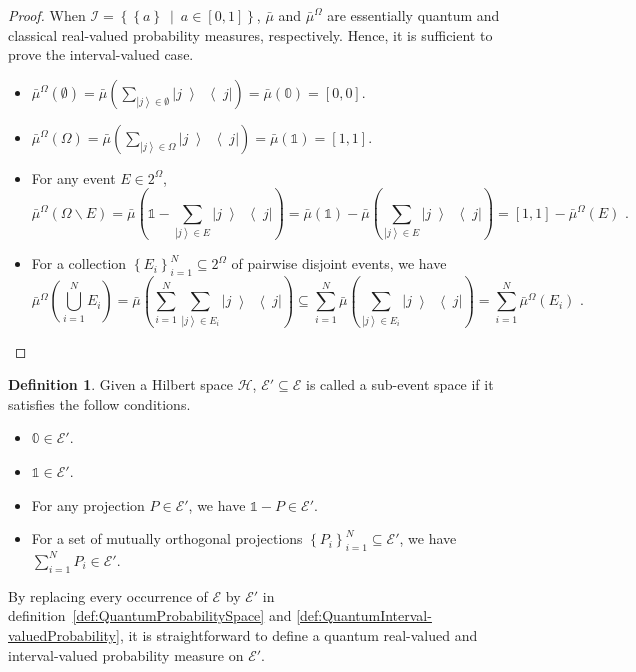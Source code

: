 \documentclass[12pt]{iopart}
\theoremstyle{plain}
\theoremstyle{definition}
\newtheorem{definition}[thm]{Definition}
\newcommand{\Hilb}{\mathcal{H}}
\newcommand{\events}{\ensuremath{\mathcal{E}}}
\newcommand{\ket}[1]{{\left\vert{#1}\right\rangle}}
\newcommand{\op}[2]{\ensuremath{\left\vert{#1}\middle\rangle\middle\langle{#2}\right\vert}}
\newcommand{\proj}[1]{\op{#1}{#1}}
\newcommand{\set}[2]{\ensuremath{\left\{ {#1}~\middle|~{#2}\right\} }}
\begin{document}
\begin{proof}When $\mathscr{I}=\set{\left\{ a\right\} }{a\in\left[0,1\right]}$,
$\bar{\mu}$ and $\bar{\mu}^{\Omega}$ are essentially quantum and
classical real-valued probability measures, respectively. Hence, it
is sufficient to prove the interval-valued case.
\begin{itemize}
\item $\bar{\mu}^{\Omega}(\emptyset)=\bar{\mu}\left(\sum_{\ket{j}\in\emptyset}\proj{j}\right)=\bar{\mu}\left(\mathbb{0}\right)=[0,0]$. 
\item $\bar{\mu}^{\Omega}(\Omega)=\bar{\mu}\left(\sum_{\ket{j}\in\Omega}\proj{j}\right)=\bar{\mu}\left(\mathbb{1}\right)=[1,1]$. 
\item For any event $E\in2^{\Omega}$,
\begin{equation}
\bar{\mu}^{\Omega}\left(\Omega\backslash E\right)=\bar{\mu}\left(\mathbb{1}-\sum_{\ket{j}\in E}\proj{j}\right)=\bar{\mu}\left(\mathbb{1}\right)-\bar{\mu}\left(\sum_{\ket{j}\in E}\proj{j}\right)=\left[1,1\right]-\bar{\mu}^{\Omega}\left(E\right)\textrm{ .}
\end{equation}
\item For a collection $\left\{ E_{i}\right\} _{i=1}^{N}\subseteq2^{\Omega}$
of pairwise disjoint events, we have
\begin{equation}
\bar{\mu}^{\Omega}\left(\bigcup_{i=1}^{N}E_{i}\right)=\bar{\mu}\left(\sum_{i=1}^{N}\sum_{\ket{j}\in E_{i}}\proj{j}\right)\subseteq\sum_{i=1}^{N}\bar{\mu}\left(\sum_{\ket{j}\in E_{i}}\proj{j}\right)=\sum_{i=1}^{N}\bar{\mu}^{\Omega}\left(E_{i}\right)\textrm{ .}
\end{equation}
\end{itemize}
\end{proof}

\begin{definition}Given a Hilbert space $\Hilb$, $\events'\subseteq\events$
is called a sub-event space if it satisfies the follow conditions.
\begin{itemize}
\item $\mathbb{0}\in\events'$.
\item $\mathbb{1}\in\events'$.
\item For any projection $P\in\events'$, we have $\mathbb{1}-P\in\events'$.
\item For a set of mutually orthogonal projections $\left\{ P_{i}\right\} _{i=1}^{N}\subseteq\events'$,
we have $\sum_{i=1}^{N}P_{i}\in\events'$.
\end{itemize}
By replacing every occurrence of $\events$ by $\events'$ in definition~\ref{def:QuantumProbabilitySpace}
and \ref{def:QuantumInterval-valuedProbability}, it is straightforward
to define a quantum real-valued and interval-valued probability measure
on $\events'$.\end{definition}
\end{document}
